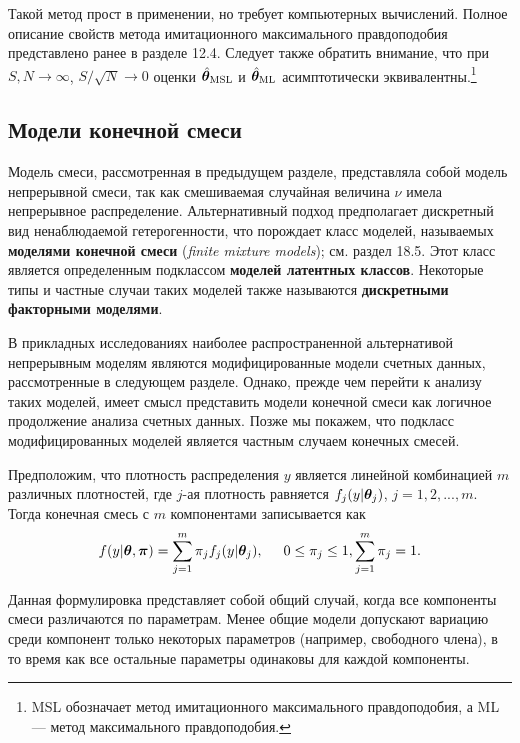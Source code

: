 Такой метод прост в применении, но требует компьютерных вычислений. Полное описание свойств метода имитационного максимального правдоподобия представлено ранее в разделе 12.4. %
Следует также обратить внимание, что при $S, N \rightarrow \infty$, $S/\sqrt{N} \rightarrow 0$ оценки $\hat{\bm{\theta}}_{\mathrm{MSL}}$ и $\hat{\bm{\theta}}_{\mathrm{ML}}$ асимптотически эквивалентны.\footnote{MSL обозначает метод имитационного максимального правдоподобия, а ML --- метод максимального правдоподобия.}


\subsection{Модели конечной смеси}\label{sec:20.4.3}

\noindent
Модель смеси, рассмотренная в предыдущем разделе, представляла собой модель непрерывной смеси, так как смешиваемая случайная величина $\nu$ имела непрерывное распределение. Альтернативный подход предполагает дискретный вид ненаблюдаемой гетерогенности, что порождает класс моделей, называемых \textbf{моделями конечной смеси} (\textit{finite mixture models}); см. раздел 18.5. Этот класс является определенным подклассом \textbf{моделей латентных классов}. %
Некоторые типы и частные случаи таких моделей также называются \textbf{дискретными факторными моделями}.

В прикладных исследованиях наиболее распространенной альтернативой непрерывным моделям являются модифицированные модели счетных данных, рассмотренные в следующем разделе. Однако, прежде чем перейти к анализу таких моделей, имеет смысл представить модели конечной смеси как логичное продолжение анализа счетных данных. Позже мы покажем, что подкласс модифицированных моделей является частным случаем конечных смесей.

Предположим, что плотность распределения $y$ является линейной комбинацией $m$ различных плотностей, где $j$-ая плотность равняется $f_j(y|\bm{\theta}_j)$, $j = 1, 2, ..., m$. Тогда конечная смесь с $m$ компонентами записывается как
    \begin{align}\label{eq:20.15}
    f(y|\bm{\theta}, \bm{\pi}) = \sum^{m}_{j = 1} \pi_j f_j (y|\bm{\theta}_j), \hspace{0.5cm} 0 \le \pi_j \le 1, \sum^{m}_{j = 1} \pi_j = 1.
    \end{align}

Данная формулировка представляет собой общий случай, когда все компоненты смеси различаются по параметрам. Менее общие модели допускают вариацию среди компонент только некоторых параметров (например, свободного члена), в то время как все остальные параметры одинаковы для каждой компоненты.


